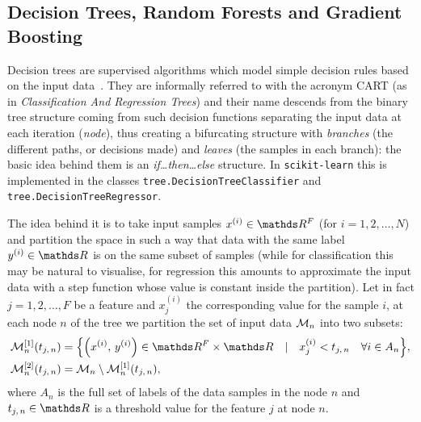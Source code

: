 \subsection{Decision Trees, Random Forests and Gradient Boosting}
\label{sec:app:trees}

Decision trees are supervised \ml algorithms which model simple decision rules based on the input data~\cite{Quinlan:1986:InductionDecisionTrees, Wittkowski:1986:ClassificationRegressionTrees}.
They are informally referred to with the acronym CART (as in \textit{Classification And Regression Trees}) and their name descends from the binary tree structure coming from such decision functions separating the input data at each iteration (\textit{node}), thus creating a bifurcating structure with \textit{branches} (the different paths, or decisions made) and \textit{leaves} (the samples in each branch): the basic idea behind them is an \textit{if\dots then\dots else} structure.
In \texttt{scikit-learn} this is implemented in the classes \texttt{tree.DecisionTreeClassifier} and \texttt{tree.DecisionTreeRegressor}.

The idea behind it is to take input samples $x^{(i)} \in \R^F$ (for $i = 1, 2, \dots, N$) and partition the space in such a way that data with the same label $y^{(i)} \in \R$ is on the same subset of samples (while for classification this may be natural to visualise, for regression this amounts to approximate the input data with a step function whose value is constant inside the partition).
Let in fact $j = 1, 2, \dots, F$ be a feature and $x^{(i)}_j$ the corresponding value for the sample $i$, at each node $n$ of the tree we partition the set of input data $\mathcal{M}_n$ into two subsets:
\begin{equation}
  \begin{split}
    \cM^{[1]}_n\qty( t_{j,\, n} )
    & =
    \qty{ \qty(x^{(i)},\, y^{(i)}) \in \R^F \times \R \quad \vert \quad x^{(i)}_j < t_{j,\, n} \quad \forall i \in A_n },
    \\
    \cM^{[2]}_n\qty( t_{j,\, n} )
    & =
    \cM_n \setminus \cM^{[1]}_n\qty( t_{j,\, n} ),
  \end{split}
\end{equation}
where $A_n$ is the full set of labels of the data samples in the node $n$ and $t_{j,\, n} \in \R$ is a threshold value for the feature $j$ at node $n$.

